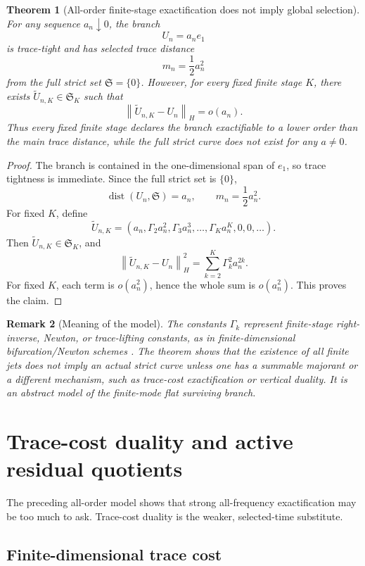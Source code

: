 \documentclass[11pt]{article}
\numberwithin{equation}{section}
\newtheorem{theorem}{Theorem}[section]
\newtheorem{remark}[theorem]{Remark}
\DeclareMathOperator{\dist}{dist}
\newcommand{\norm}[2]{\left\|#1\right\|_{#2}}
\newcommand{\frakS}{\mathfrak S}
\begin{document}
\begin{theorem}[All-order finite-stage exactification does not imply global selection]\label{thm:nonsummable-flat}
For any sequence \(a_n\downarrow0\), the branch
\[
U_n=a_ne_1
\]
is trace-tight and has selected trace distance
\[
m_n=\frac12a_n^2
\]
from the full strict set \(\frakS=\{0\}\).  However, for every fixed finite stage \(K\), there exists \(\widetilde U_{n,K}\in\frakS_K\) such that
\[
\norm{\widetilde U_{n,K}-U_n}{H}=o(a_n).
\]
Thus every fixed finite stage declares the branch exactifiable to a lower order than the main trace distance, while the full strict curve does not exist for any \(a\ne0\).
\end{theorem}

\begin{proof}
The branch is contained in the one-dimensional span of \(e_1\), so trace tightness is immediate.  Since the full strict set is \(\{0\}\),
\[
\dist(U_n,\frakS)=a_n,
\qquad
m_n=\frac12a_n^2.
\]
For fixed \(K\), define
\[
\widetilde U_{n,K}=
(a_n,\Gamma_2a_n^2,\Gamma_3a_n^3,\ldots,\Gamma_Ka_n^K,0,0,\ldots).
\]
Then \(\widetilde U_{n,K}\in\frakS_K\), and
\[
\norm{\widetilde U_{n,K}-U_n}{H}^2
=
\sum_{k=2}^K\Gamma_k^2a_n^{2k}.
\]
For fixed \(K\), each term is \(o(a_n^2)\), hence the whole sum is \(o(a_n^2)\).  This proves the claim.
\end{proof}

\begin{remark}[Meaning of the model]
The constants \(\Gamma_k\) represent finite-stage right-inverse, Newton, or trace-lifting constants, as in finite-dimensional bifurcation/Newton schemes \cite{Kielhofer2012}.  The theorem shows that the existence of all finite jets does not imply an actual strict curve unless one has a summable majorant or a different mechanism, such as trace-cost exactification or vertical duality.  It is an abstract model of the finite-mode flat surviving branch.
\end{remark}

\section{Trace-cost duality and active residual quotients}\label{sec:trace-cost}

The preceding all-order model shows that strong all-frequency exactification may be too much to ask.  Trace-cost duality is the weaker, selected-time substitute.

\subsection{Finite-dimensional trace cost}
\end{document}
